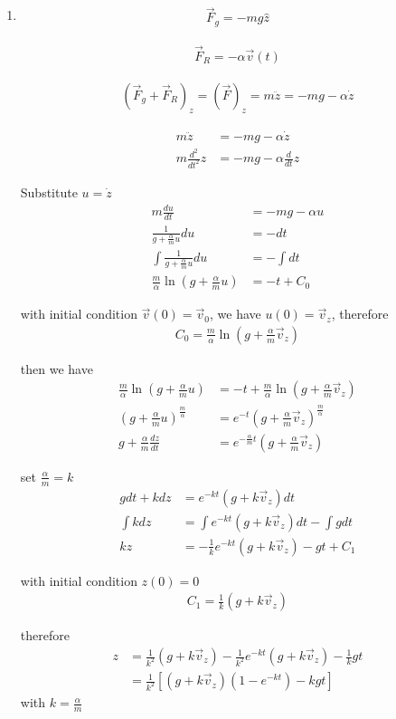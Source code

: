 \documentclass[11pt,a4paper]{article}
\begin{document}
\begin{enumerate}

\item[]

\begin{align}
\vec{F}_g=-mg\hat{z}
\end{align}

\begin{align}
\vec{F}_R=-\alpha\vec{v}(t)
\end{align}

\begin{align}
(\vec{F}_g+\vec{F}_R)_z=(\vec{F})_z=m\ddot{z}=-mg-\alpha\dot{z}
\end{align}

\begin{align}
m\ddot{z}&=-mg-\alpha\dot{z} \\
m\frac{d^2}{dt^2}z&=-mg-\alpha\frac{d}{dt}z
\end{align}

Substitute $u=\dot{z}$
\begin{align}
m\frac{du}{dt}&=-mg-\alpha u \\
\frac{1}{g+\frac{\alpha}{m}u}du&=-dt \\
\int \frac{1}{g+\frac{\alpha}{m}u}du&=-\int dt \\
\frac{m}{\alpha}\ln(g+\frac{\alpha}{m}u)&=-t+C_0
\end{align}

with initial condition $\vec{v}(0)=\vec{v}_0$, we have $u(0)=\vec{v}_z$, therefore
\begin{align}
C_0=\frac{m}{\alpha}\ln(g+\frac{\alpha}{m}\vec{v}_z)
\end{align}

then we have
\begin{align}
\frac{m}{\alpha}\ln(g+\frac{\alpha}{m}u)&=-t+\frac{m}{\alpha}\ln(g+\frac{\alpha}{m}\vec{v}_z) \\
(g+\frac{\alpha}{m}u)^\frac{m}{\alpha}&=e^{-t}(g+\frac{\alpha}{m}\vec{v}_z)^\frac{m}{\alpha} \\
g+\frac{\alpha}{m}\frac{dz}{dt}&=e^{-\frac{\alpha}{m}t}(g+\frac{\alpha}{m}\vec{v}_z)
\end{align}

set $\frac{\alpha}{m}=k$
\begin{align}
gdt+kdz&=e^{-kt}(g+k\vec{v}_z)dt \\
\int kdz&=\int e^{-kt}(g+k\vec{v}_z)dt-\int gdt \\
kz&=-\frac{1}{k}e^{-kt}(g+k\vec{v}_z)-gt+C_1
\end{align}

\newpage

with initial condition $z(0)=0$
\begin{align}
C_1=\frac{1}{k}(g+k\vec{v}_z)
\end{align}

therefore
\begin{align}
z
&=\frac{1}{k^2}(g+k\vec{v}_z)-\frac{1}{k^2}e^{-kt}(g+k\vec{v}_z)-\frac{1}{k}gt \\
&=\frac{1}{k^2}[(g+k\vec{v}_z)(1-e^{-kt})-kgt]
\end{align}
with $k=\frac{\alpha}{m}$

\end{enumerate}
\end{document}
